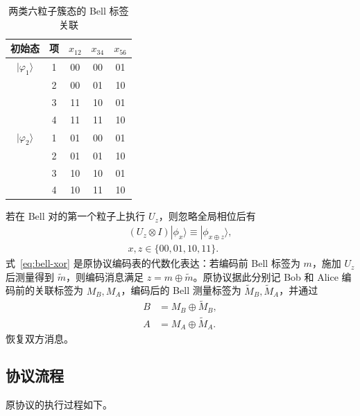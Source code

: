 \documentclass[UTF8,10pt,a4paper]{ctexart}
\theoremstyle{aqdplain}
\begin{document}
\begin{table}[t]
\centering
\caption{两类六粒子簇态的 Bell 标签关联}
\label{tab:cluster-correlation}
\begin{tabular}{@{}ccccc@{}}
\toprule
初始态 & 项 & $x_{12}$ & $x_{34}$ & $x_{56}$ \\
\midrule
$|\varphi_1\rangle$ & 1 & 00 & 00 & 01 \\
 & 2 & 00 & 01 & 10 \\
 & 3 & 11 & 10 & 01 \\
 & 4 & 11 & 11 & 10 \\
\midrule
$|\varphi_2\rangle$ & 1 & 01 & 00 & 01 \\
 & 2 & 01 & 01 & 10 \\
 & 3 & 10 & 10 & 01 \\
 & 4 & 10 & 11 & 10 \\
\bottomrule
\end{tabular}
\end{table}

若在 Bell 对的第一个粒子上执行 $U_z$，则忽略全局相位后有
\begin{equation}
\begin{gathered}
(U_z\otimes I)|\phi_x\rangle\equiv|\phi_{x\oplus z}\rangle,\\
x,z\in\{00,01,10,11\}.
\end{gathered}
\label{eq:bell-xor}
\end{equation}
式~\eqref{eq:bell-xor} 是原协议编码表的代数化表达：若编码前 Bell 标签为 $m$，施加 $U_z$ 后测量得到 $\widetilde m$，则编码消息满足 $z=m\oplus\widetilde m$。原协议据此分别记 Bob 和 Alice 编码前的关联标签为 $M_B,M_A$，编码后的 Bell 测量标签为 $\widetilde M_B,\widetilde M_A$，并通过
\begin{equation}
\begin{aligned}
B &= M_B\oplus\widetilde M_B,\\
A &= M_A\oplus\widetilde M_A.
\end{aligned}
\label{eq:orig-recovery}
\end{equation}
恢复双方消息。

\subsection{协议流程}

原协议的执行过程如下。
\end{document}
